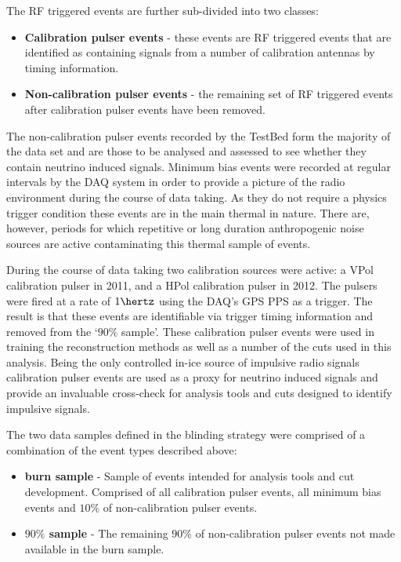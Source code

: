The RF triggered events are further sub-divided into two classes:

\begin{itemize}
\item \textbf{Calibration pulser events} - these events are RF triggered events that are identified as containing signals from a number of calibration antennas by timing information. 
\item \textbf{Non-calibration pulser events} - the remaining set of RF triggered events after calibration pulser events have been removed.
\end{itemize}



The non-calibration pulser events recorded by the TestBed form the majority of the data set and are those to be analysed and assessed to see whether they contain neutrino induced signals. Minimum bias events were recorded at regular intervals by the DAQ system in order to provide a picture of the radio environment during the course of data taking. As they do not require a physics trigger condition these events are in the main thermal in nature. There are, however, periods for which repetitive or long duration anthropogenic noise sources are active contaminating this thermal sample of events.

During the course of data taking two calibration sources were active: a VPol calibration pulser in 2011, and a HPol calibration pulser in 2012. The pulsers were fired at a rate of $1 \hertz$ using the DAQ's GPS PPS as a trigger. The result is that these events are identifiable via trigger timing information and removed from the `$90 \%$ sample'. These calibration pulser events were used in training the reconstruction methods as well as a number of the cuts used in this analysis. Being the only controlled in-ice source of impulsive radio signals calibration pulser events are used as a proxy for neutrino induced signals and provide an invaluable cross-check for analysis tools and cuts designed to identify impulsive signals.

The two data samples defined in the blinding strategy were comprised of a combination of the event types described above:

\begin{itemize}

\item \textbf{burn sample} - Sample of events intended for analysis tools and cut development. Comprised of all calibration pulser events, all minimum bias events and $10 \%$ of non-calibration pulser events.
\item \textbf{$90 \%$ sample} - The remaining $90 \%$ of non-calibration pulser events not made available in the burn sample.

\end{itemize}


